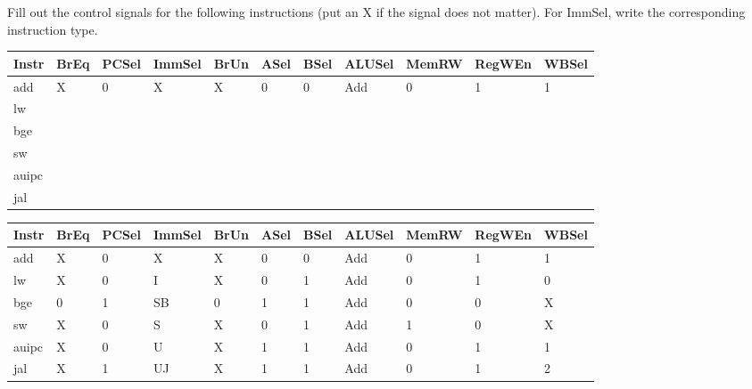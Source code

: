\begin{blocksection}
\question
Fill out the control signals for the following instructions (put an X if the signal does not matter).  For ImmSel, write the corresponding instruction type.

\begin{tabular}{ |l|l|l|l|l|l|l|l|l|l|l| } 
 \hline
 Instr & BrEq & PCSel & ImmSel & BrUn & ASel & BSel & ALUSel & MemRW & RegWEn & WBSel \\ 
 \hline
 add & X & 0 & X & X & 0 & 0 & Add & 0 & 1 & 1 \\ 
 \hline
 lw & & & & & & & & & & \\ 
 \hline 
 bge & & & & & & & & & & \\ 
 \hline
 sw & & & & & & & & & & \\ 
 \hline 
 auipc & & & & & & & & & & \\ 
 \hline
 jal & & & & & & & & & & \\ 
 \hline
\end{tabular}

\begin{solution}[0.5in]
 \begin{tabular}{ |l|l|l|l|l|l|l|l|l|l|l| } 
 \hline
 Instr & BrEq & PCSel & ImmSel & BrUn & ASel & BSel & ALUSel & MemRW & RegWEn & WBSel \\ 
 \hline
 add & X & 0 & X & X & 0 & 0 & Add & 0 & 1 & 1 \\
 \hline
 lw & X & 0 & I & X & 0 & 1 & Add & 0 & 1 & 0 \\ 
 \hline 
 bge & 0 & 1 & SB & 0 & 1 & 1 & Add & 0 & 0 & X \\ 
 \hline
 sw & X & 0 & S & X & 0 & 1 & Add & 1 & 0 & X \\ 
 \hline 
 auipc & X & 0 & U & X & 1 & 1 & Add & 0 & 1 & 1\\ 
 \hline
 jal & X & 1 & UJ & X & 1 & 1 & Add & 0 & 1 & 2 \\ 
 \hline
\end{tabular}

\end{solution}

\end{blocksection}